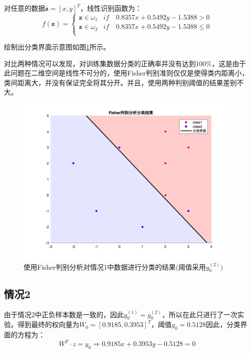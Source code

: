 \documentclass[cn]{elegantbook}
\begin{document}
对任意的数据$\mathbf{z}=[x,y]^T$，线性识别函数为：
\begin{equation}
f(\mathbf{z})=\left\{
\begin{array}{cc}
\mathbf{z}\in \omega_1 & if \quad 0.8357x + 0.5492y - 1.5388>0 \\
\mathbf{z}\in \omega_2 & if \quad 0.8357x + 0.5492y - 1.5388\le 0 \\
\end{array}
\right.
\end{equation}

绘制出分类界面示意图如图\ref{fig6}所示。

对比两种情况可以发现，对训练集数据分类的正确率并没有达到100\%，这是由于此问题在二维空间是线性不可分的，使用Fisher判别准则仅仅是使得类内距离小，类间距离大，并没有保证完全将其分开。并且，使用两种判别阈值的结果差别不大。


\begin{figure}[!h]
	\centering
	\includegraphics[width=\textwidth]{images/fisher1res2}
	\caption{\label{fig6}使用Fisher判别分析对情况1中数据进行分类的结果(阈值采用$y_0^{(2)})$}
\end{figure}

\subsection{情况2}
由于情况2中正负样本数是一致的，因此$y_0^{(1)}=y_0^{(2)}$，所以在此只进行了一次实验。得到最终的权向量为$W_0=[0.9185,0.3953]^T$，阈值$y_0=0.5128$因此，分类界面的方程为：
\begin{equation}
W^T\cdot z=y_0\Rightarrow 0.9185x + 0.3953y - 0.5128=0
\end{equation}
\end{document}
